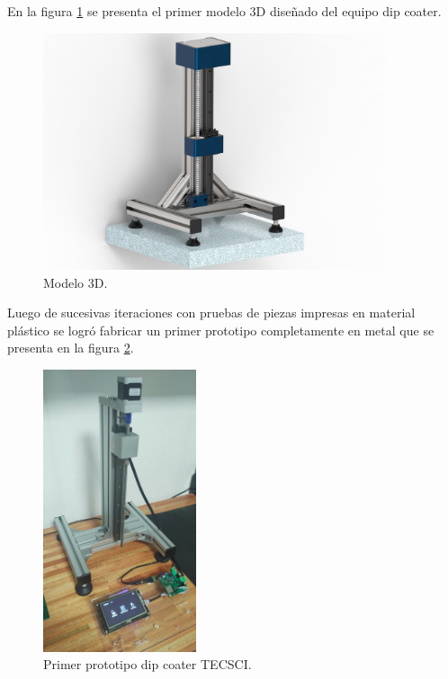 En la figura \ref{fig:mecanica_3d_model} se presenta el primer modelo 3D diseñado del equipo dip coater.
\begin{figure}[h]
	\centering
	\includegraphics[width=0.9\textwidth]{./Figures/3d.jpg}
	\caption{Modelo 3D.}
	\label{fig:mecanica_3d_model}
\end{figure}



Luego de sucesivas iteraciones con pruebas de piezas impresas en material plástico se logró fabricar un primer prototipo completamente en metal que se presenta en la figura \ref{fig:mecanica_real_model}.

\begin{figure}[h]
	\centering
	\includegraphics[width=0.4\textwidth]{./Figures/real.png}
	\caption{Primer prototipo dip coater TECSCI.}
	\label{fig:mecanica_real_model}
\end{figure}

